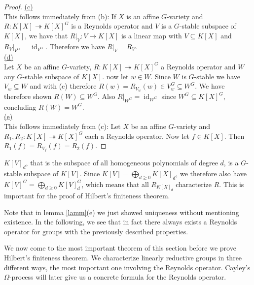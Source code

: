 \begin{proof}
  \underline{(c)}\\
  This follows immediately from (b):
  If $X$ is an affine $G$-variety and $R \colon K[X] \twoheadrightarrow K[X]^G$ is a Reynolds operator and $V$ is a $G$-stable subspace of $K[X]$, we have that $\left. R \right|_V \colon V \rightarrow K[X]$ is a linear map with $V \subseteq K[X]$ and $\left. R_V \right|_{V^G} = \operatorname{id}_{V^G}$.
  Therefore we have $\left. R \right|_V = R_V$.  \\
  \underline{(d)}\\
  Let $X$ be an affine $G$-variety, $R \colon K[X] \twoheadrightarrow K[X]^G$ a Reynolds operator and $W$ any $G$-stable subspace of $K[X]$.
  now let $w \in W$.
  Since $W$ is $G$-stable we have $V_w \subseteq W$ and with (c) therefore $R(w) = R_{V_w} (w) \in V_w^G \subseteq W^G$.
  We have therefore shown $R(W) \subseteq W^G$.
  Also $\left. R \right|_{W^G} = \operatorname{id}_{W^G}$ since $W^G \subseteq K[X]^G$, concluding $R(W) = W^G$.  \\
  \underline{(e)}\\
  This follows immediately from (c):
  Let $X$ be an affine $G$-variety and $R_1,R_2 \colon K[X] \twoheadrightarrow K[X]^G$ each a Reynolds operator.
  Now let $f \in K[X]$.
  Then $R_1(f) = R_{V_f} (f) = R_2 (f)$.
\end{proof}

\begin{remark}
  $K[V]_d$, that is the subspace of all homogeneous polynomials of degree $d$, is a $G$-stable subspace of $K[V]$.
  Since $K[V] = \bigoplus_{d \geq 0} K[X]_d$, we therefore also have $K[V]^G = \bigoplus_{d \geq 0} K[V]_d^G$, which means that all $R_{K[X]_d}$ characterize $R$.
  This is important for the proof of Hilbert's finiteness theorem.
\end{remark}

\begin{remark}
  Note that in lemma \ref{lamm}(e) we just showed uniqueness without mentioning existence.
  In the following, we see that in fact there always exists a Reynolds operator for groups with the previously described properties.
\end{remark}

We now come to the most important theorem of this section before we prove Hilbert's finiteness theorem.
We characterize linearly reductive groups in three different ways, the most important one involving the Reynolds operator.
Cayley's $\Omega$-process will later give us a concrete formula for the Reynolds operator.

